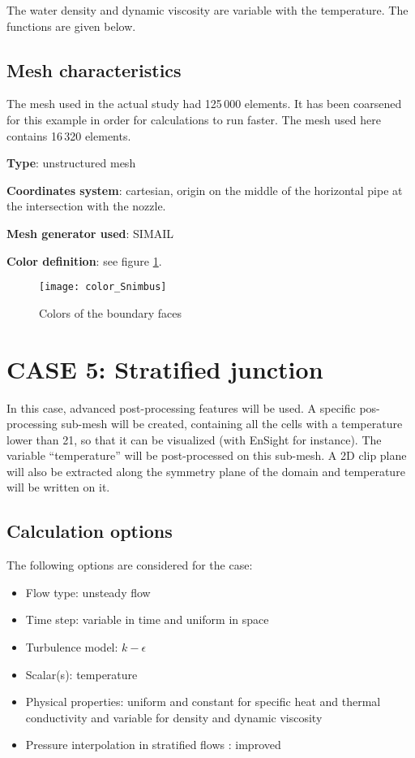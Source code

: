 The water density and dynamic viscosity are variable with the temperature. The
functions are given below.


        \subsection{Mesh characteristics}
The mesh used in the actual study had 125\,000 elements. It has been coarsened
for this example in order for calculations to run faster. The mesh used here
contains 16\,320 elements.

{\bfseries Type}: unstructured mesh

{\bfseries Coordinates system}: cartesian, origin on the middle of the horizontal pipe at the intersection with the nozzle.

{\bfseries Mesh generator used}: SIMAIL

{\bfseries Color definition}: see figure \ref{fige1_e5}.

\begin{figure}[h!]
\begin{center}
\texttt{[image: color\_Snimbus]}
\caption{Colors of the boundary faces}
\label{fige1_e5}
\end{center}
\end{figure}


\section{CASE 5: Stratified junction}
In this case, advanced post-processing features will be used. A specific
pos-processing sub-mesh will be created, containing all the cells with a
temperature lower than 21\degresC, so that it can be visualized (with EnSight
for instance). The variable ``temperature'' will be post-processed on this
sub-mesh. A 2D clip plane will also be extracted along the symmetry plane of the
domain and temperature will be written on it.


        \subsection{Calculation options}

The following options are considered for the case:
\begin{itemize}
\renewcommand{\labelitemi}{$\rightarrow$}
        \item Flow type: unsteady flow
        \item Time step: variable in time and uniform in space
        \item Turbulence model: $k-\epsilon$
        \item Scalar(s): temperature
        \item Physical properties: uniform and constant for specific heat and
thermal conductivity and variable for density and dynamic viscosity
        \item Pressure interpolation in stratified flows : improved
\end{itemize}


